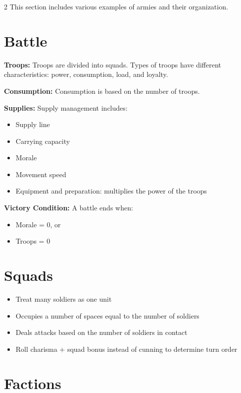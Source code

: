 \begin{multicols}{2}
This section includes various examples of armies and their organization.

\section{Battle}

\textbf{Troops:} Troops are divided into squads. Types of troops have different characteristics: power, consumption, load, and loyalty.

\textbf{Consumption:} Consumption is based on the number of troops.

\textbf{Supplies:} Supply management includes:

\begin{itemize}
    \setlength\itemsep{0em}
    \setlength{\parskip}{0em}
    \item Supply line
    \item Carrying capacity
    \item Morale
    \item Movement speed
    \item Equipment and preparation: multiplies the power of the troops
\end{itemize}

\textbf{Victory Condition:} A battle ends when:

\begin{itemize}
    \setlength\itemsep{0em}
    \setlength{\parskip}{0em}
    \item Morale = 0, or
    \item Troops = 0
\end{itemize}

\section{Squads}

\begin{itemize}
    \setlength\itemsep{0em}
    \setlength{\parskip}{0em}
    \item Treat many soldiers as one unit
    \item Occupies a number of spaces equal to the number of soldiers
    \item Deals attacks based on the number of soldiers in contact
    \item Roll charisma + squad bonus instead of cunning to determine turn order
\end{itemize}


\section{Factions}


\end{multicols}
